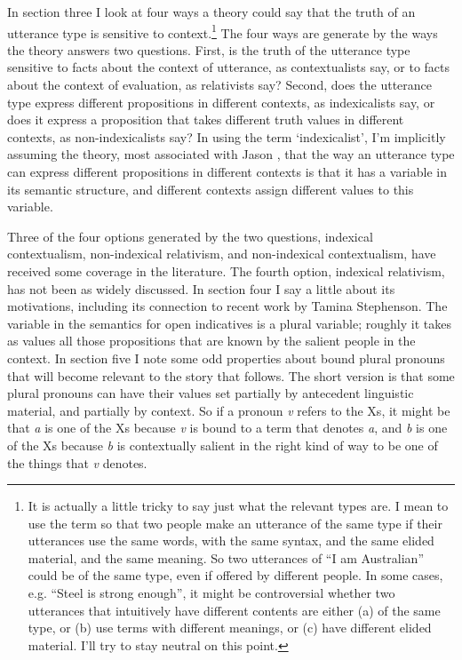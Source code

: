 In section three I look at four ways a theory could say that the truth of an utterance type is sensitive to context.\footnote{ It is actually a little tricky to say just what the relevant types are. I mean to use the term so that two people make an utterance of the same type if their utterances use the same words, with the same syntax, and the same elided material, and the same meaning. So two utterances of ``I am Australian'' could be of the same type, even if offered by different people. In some cases, e.g. ``Steel is strong enough'', it might be controversial whether two utterances that intuitively have different contents are either (a) of the same type, or (b) use terms with different meanings, or (c) have different elided material. I'll try to stay neutral on this point.} The four ways are generate by the ways the theory answers two questions. First, is the truth of the utterance type sensitive to facts about the context of utterance, as contextualists say, or to facts about the context of evaluation, as relativists say? Second, does the utterance type express different propositions in different contexts, as indexicalists say, or does it express a proposition that takes different truth values in different contexts, as non-indexicalists say? In using the term `indexicalist', I'm implicitly assuming the theory, most associated with Jason \cite{Stanley2007-STALIC} , that the way an utterance type can express different propositions in different contexts is that it has a variable in its semantic structure, and different contexts assign different values to this variable.

Three of the four options generated by the two questions, indexical contextualism, non-indexical relativism, and non-indexical contextualism, have received some coverage in the literature. The fourth option, indexical relativism, has not been as widely discussed. In section four I say a little about its motivations, including its connection to recent work by Tamina Stephenson. The variable in the semantics for open indicatives is a plural variable; roughly it takes as values all those propositions that are known by the salient people in the context. In section five I note some odd properties about bound plural pronouns that will become relevant to the story that follows. The short version is that some plural pronouns can have their values set partially by antecedent linguistic material, and partially by context. So if a pronoun \textit{v} refers to the Xs, it might be that \textit{a} is one of the Xs because \textit{v} is bound to a term that denotes \textit{a}, and \textit{b} is one of the Xs because \textit{b} is contextually salient in the right kind of way to be one of the things that \textit{v} denotes. 

